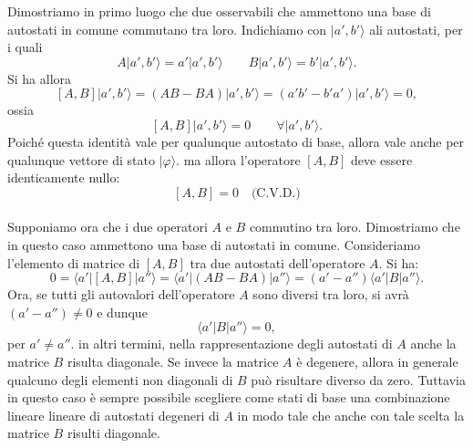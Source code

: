 Dimostriamo in primo luogo che due osservabili che ammettono una base di autostati in comune commutano tra loro. Indichiamo con $\vert a', b' \rangle$ ali autostati, per i quali
	\begin{equation}
		A\vert a', b' \rangle= a'\vert a', b' \rangle \qquad B\vert a', b' \rangle= b'\vert a', b' \rangle.
	\end{equation}
Si ha allora
	\begin{equation}
		\left[ A, B \right]\vert a', b' \rangle = \left(AB-BA\right)\vert a', b' \rangle=\left( a'b'-b'a'\right)\vert a', b' \rangle=0,
	\end{equation}
ossia
	\begin{equation}
		\left[A,B\right]\vert a', b' \rangle=0 \qquad \forall \vert a', b' \rangle.
	\end{equation}
Poiché questa identità vale per qualunque autostato di base, allora vale anche per qualunque vettore di stato $\vert \varphi \rangle$. ma allora l'operatore $\left[ A, B \right]$ deve essere identicamente nullo:
	\begin{equation}
		\left[ A, B \right] =0 \quad \textrm{(C.V.D.)}
	\end{equation}
	\\
	
Supponiamo ora che i due operatori $A$ e $B$ commutino tra loro. Dimostriamo che in questo caso ammettono una base di autostati in comune. Consideriamo l'elemento di matrice di $[A,B]$ tra due autostati dell'operatore $A$. Si ha:
	\begin{equation}
		0 = \langle a' \vert \left[A, B\right] \vert a'' \rangle = \langle a' \vert \left( AB-BA \right) \vert a'' \rangle = \left( a'-a''\right) \langle a' \vert B \vert a'' \rangle . 
	\end{equation}
Ora, se tutti gli autovalori dell'operatore $A$ sono diversi tra loro, si avrà $(a'-a'') \neq 0$ e dunque
	\begin{equation}
		\langle a' \vert B \vert a'' \rangle =0,
	\end{equation}
per $a' \neq a''$.
in altri termini, nella rappresentazione degli autostati di $A$ anche la matrice $B$ risulta diagonale. Se invece la matrice $A$ è degenere, allora in generale qualcuno degli elementi non diagonali di $B$ può risultare diverso da zero. Tuttavia in questo caso è sempre possibile scegliere come stati di base una combinazione lineare lineare di autostati degeneri di $A$ in modo tale che anche con tale scelta la matrice $B$ risulti diagonale.\\

